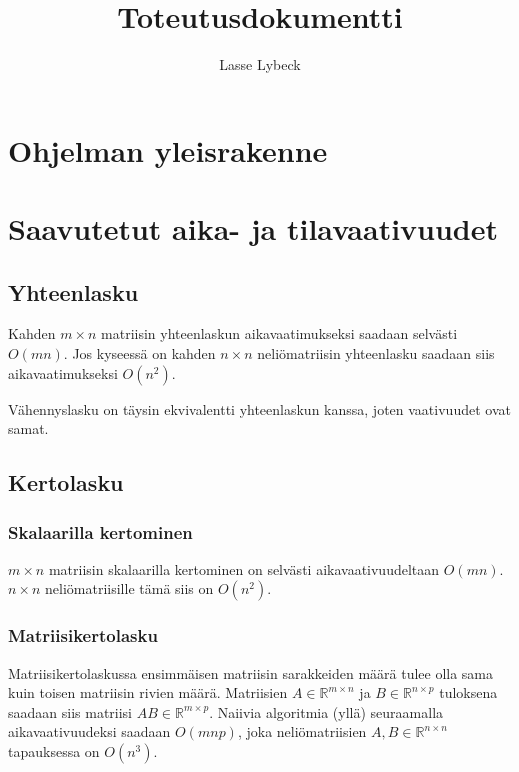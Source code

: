 \documentclass[10pt,a4paper]{article}
\author{Lasse Lybeck}
\title{Toteutusdokumentti}
\newcommand{\R}{\ensuremath{\mathbb{R}}}
\newcommand{\pseudo}[1]{{\small}}
\begin{document}
\maketitle

\section{Ohjelman yleisrakenne}


\section{Saavutetut aika- ja tilavaativuudet}

\subsection{Yhteenlasku}

\pseudo{add}

Kahden $m\times n$ matriisin yhteenlaskun aikavaatimukseksi saadaan selvästi $O(mn)$.
Jos kyseessä on kahden $n\times n$ neliömatriisin yhteenlasku saadaan siis aikavaatimukseksi $O(n^2)$.

Vähennyslasku on täysin ekvivalentti yhteenlaskun kanssa, joten vaativuudet ovat samat.

\subsection{Kertolasku}

\subsubsection{Skalaarilla kertominen}

\pseudo{scale}

$m\times n$ matriisin skalaarilla kertominen on selvästi aikavaativuudeltaan $O(mn)$. $n\times n$ neliömatriisille
tämä siis on $O(n^2)$.

\subsubsection{Matriisikertolasku}

\pseudo{mul}

Matriisikertolaskussa ensimmäisen matriisin sarakkeiden määrä tulee olla sama kuin toisen matriisin rivien määrä.
Matriisien $A\in \R^{m\times n}$ ja $B\in \R^{n\times p}$ tuloksena saadaan siis matriisi $AB\in \R^{m\times p}$.
Naiivia algoritmia (yllä) seuraamalla aikavaativuudeksi saadaan $O(mnp)$, joka neliömatriisien $A,B\in \R^{n\times n}$
tapauksessa on $O(n^3)$.
\end{document}
